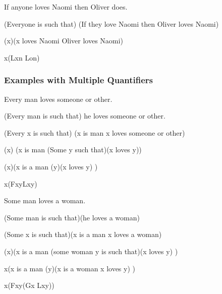 \begin{argument}
\item[\textbf{(12)}] If anyone loves Naomi then Oliver does.
\item[$\simeq$] (Everyone is such that)
  (If they love Naomi then Oliver loves Naomi)
\item[$\simeq$] (\eforall x)(x loves Naomi \eif Oliver loves Naomi)
\item[$\simeq$] \eforall x(Lxn \eif Lon)
\end{argument}

\subsubsection{Examples with Multiple Quantifiers}

\begin{argument}
\item[\textbf{(1)}] Every man loves someone or other.
\item[$\simeq$] (Every man is such that) he loves someone or other.
\item[$\simeq$] (Every x is such that)
  (x is man \eif x loves someone or other)
\item[$\simeq$] (\eforall x)
    (x is man \eif (Some y such that)(x loves y))
\item[$\simeq$] (\eforall x)(x is a man \eif (\eexists y)(x loves y) )
\item[$\simeq$] \eforall x(Fx\eif\eexists yLxy)
\end{argument}

\begin{argument}
\item[\textbf{(2)}] Some man loves a woman.
\item[$\simeq$] (Some man is such that)(he loves a woman)
\item[$\simeq$] (Some x is such that)(x is a man \eand x loves a woman)
\item[$\simeq$] (\eexists x)(x is a man \eand
  (some woman y is such that)(x loves y) )
\item[$\simeq$] \eexists x(x is a man \eand
  (\eexists y)(x is a woman \eand x loves y) )
\item[$\simeq$] \eexists x(Fx\eand\eexists y(Gx \eand Lxy))
\end{argument}

